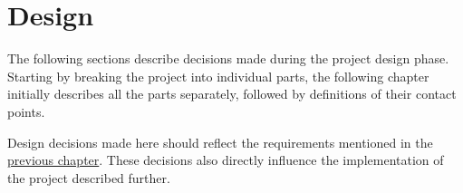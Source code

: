 \chapter{Design}

The following sections describe decisions made during the project design phase.
Starting by breaking the project into individual parts, the following chapter initially describes all the parts separately, followed by definitions of their contact points.

Design decisions made here should reflect the requirements mentioned in the \hyperref[requirements]{previous chapter}.
These decisions also directly influence the implementation of the project described further.




\clearpage



